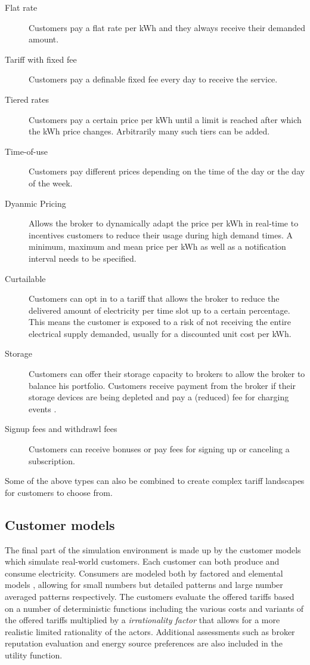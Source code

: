 \begin{description}
	\item[Flat rate] Customers pay a flat rate per kWh and they always receive their demanded amount.
	\item[Tariff with fixed fee] Customers pay a definable fixed fee every day to receive the service. 
	\item [Tiered rates] Customers pay a certain price per kWh until a limit is reached after which the kWh price changes. Arbitrarily many such tiers can be added.
	\item[Time-of-use] Customers pay different prices depending on the time of the day or the day of the week.
	\item[Dyanmic Pricing] Allows the broker to dynamically adapt the price per kWh in real-time to incentives customers to reduce their usage during high demand times. A minimum, maximum and mean price per kWh as well as a notification interval needs to be specified. 
	\item[Curtailable] Customers can opt in to a tariff that allows the broker to reduce the delivered amount of electricity per time slot up to a certain percentage. This means the customer is exposed to a risk of not receiving the entire electrical supply demanded, usually for a discounted unit cost per kWh.
	\item[Storage] Customers can offer their storage capacity to brokers to allow the broker to balance his portfolio. Customers receive payment from the broker if their storage devices are being depleted and pay a (reduced) fee for charging events \cite[p.9]{ketter2018powertac}. 
	\item[Signup fees and withdrawl fees] Customers can receive bonuses or pay fees for signing up or canceling a subscription.
\end{description}

Some of the above types can also be combined to create complex tariff landscapes for customers to choose from. 

\subsection{Customer models}%
\label{sub:customer_models}

The final part of the simulation environment is made up by the customer models which simulate real-world customers. Each customer can both produce and consume electricity. Consumers are modeled both by factored and elemental models \cite[p.14]{ketter2018powertac}, allowing for small numbers but detailed patterns and large number averaged patterns respectively. The customers evaluate the offered tariffs based on a number of deterministic functions including the various costs and variants of the offered tariffs multiplied by a \emph{irrationality factor} that allows for a more realistic limited rationality of the actors. Additional assessments such as broker reputation evaluation and energy source preferences are also included in the utility function. 

